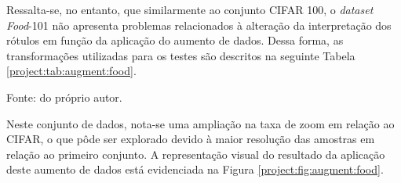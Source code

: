 Ressalta-se, no entanto, que similarmente ao conjunto CIFAR 100, o \textit{dataset} \textit{Food}-101 não apresenta problemas relacionados à alteração da interpretação dos rótulos em função da aplicação do aumento de dados. Dessa forma, as transformações utilizadas para os testes são descritos na seguinte Tabela \ref{project:tab:augment:food}.

\begin{table}[H]
    \centering
    \caption{Transformações geométricas aplicadas no conjunto de dados \textit{Food}-101.}
    \label{project:tab:augment:food}

    \vspace*{1 cm}
    Fonte: do próprio autor.
\end{table}

Neste conjunto de dados, nota-se uma ampliação na taxa de zoom em relação ao CIFAR, o que pôde ser explorado devido à maior resolução das amostras em relação ao primeiro conjunto. A representação visual do resultado da aplicação deste aumento de dados está evidenciada na Figura \ref{project:fig:augment:food}.

